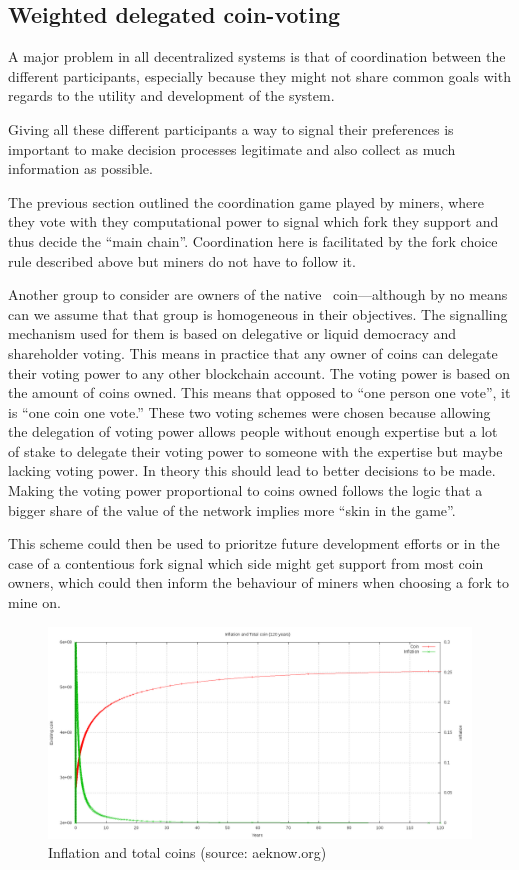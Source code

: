 \subsection{Weighted delegated coin-voting}

A major problem in all decentralized systems is that of coordination between
the different participants, especially because they might not share common
goals with regards to the utility and development of the system.

Giving all these different participants a way to signal their preferences is
important to make decision processes legitimate and also collect as much
information as possible.

The previous section outlined the coordination game played by miners, where
they vote with they computational power to signal which fork they support and
thus decide the \enquote{main chain}. Coordination here is facilitated by the
fork choice rule described above but miners do not have to follow it.

Another group to consider are owners of the native \aet\ coin---although by no
means can we assume that that group is homogeneous in their objectives. The
signalling mechanism used for them is based on delegative
 or liquid democracy \cite{ford2002delegative} and shareholder voting. This
means in practice that any owner of coins can delegate their voting power to
any other blockchain account. The voting power is based on the amount of coins
owned. This means that opposed to \enquote{one person one vote}, it is
\enquote{one coin one vote.}
These two voting schemes were chosen because allowing the delegation of voting
power allows people without enough expertise but a lot of stake to
delegate their voting power to someone with the expertise but maybe lacking
voting power. In theory this should lead to better decisions to be made. Making
the voting power proportional to coins owned follows the logic that a bigger
share of the value of the network implies more \enquote{skin in the game}.

This scheme could then be used to prioritze future development efforts or in
the case of a contentious fork signal which side might get support from most
coin owners, which could then inform the behaviour of miners when choosing a
fork to mine on.


\begin{figure}[h!]
   \includegraphics[scale=0.31]{ae-inflation_110_years.png}
   \caption{Inflation and total coins (source: aeknow.org)}
   \label{fig:coins}
\end{figure}



